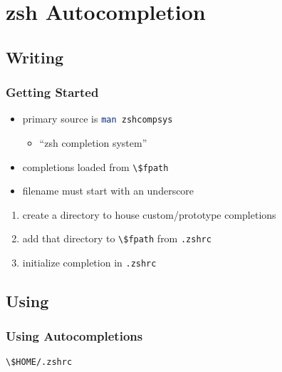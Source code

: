 \documentclass[]{beamer}
\newcommand{\cli}[1]{\texttt{#1}}
\renewcommand{\sh}[1]{\lstinline[columns=fixed,language=sh]{#1}}
\begin{document}
\section{zsh Autocompletion}
\subsection{Writing}
\begin{frame}
  \frametitle{Getting Started}
  \begin{itemize}
  \item
    primary source is \sh{man zshcompsys}
    \begin{itemize}
    \item
       ``zsh completion system''
    \end{itemize}
  \item
    completions loaded from \sh{\$fpath}
  \item
    filename must start with an underscore
  \end{itemize}
  \begin{enumerate}
  \item
    create a directory to house custom/prototype completions
  \item
    add that directory to \sh{\$fpath} from \cli{.zshrc}
  \item
    initialize completion in \cli{.zshrc}
  \end{enumerate}
\end{frame}

\subsection{Using}
\begin{frame}
  \frametitle{Using Autocompletions}
  \begin{block}{\sh{\$HOME/.zshrc}}
    
  \end{block}
\end{frame}
\end{document}
